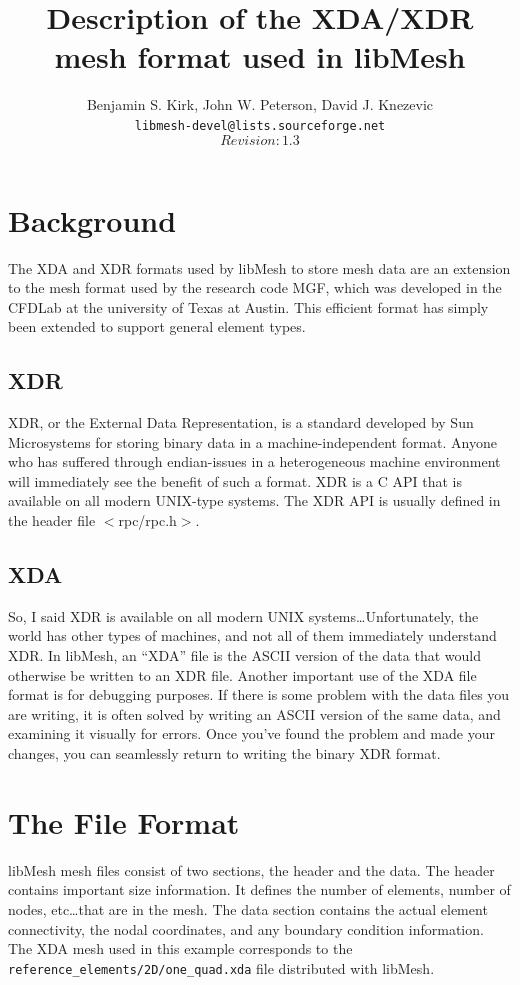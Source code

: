 \documentclass[12pt]{article}
\begin{document}
  
\title{Description of the XDA/XDR mesh format used in libMesh}
\author{Benjamin S. Kirk, John W. Peterson, David J. Knezevic \\
        \texttt{libmesh-devel@lists.sourceforge.net} \\
	$$Revision: 1.3 $$} 
\maketitle

\section{Background}
The XDA and XDR formats used by libMesh to store mesh data are an extension to the mesh format used by the research code MGF, which was developed in the CFDLab at the university of Texas at Austin.  This efficient format has simply been extended to support general element types.

\subsection{XDR}
XDR, or the External Data Representation, is a standard developed by Sun Microsystems for storing binary data in a machine-independent format.  Anyone who has suffered through endian-issues in a heterogeneous machine environment will immediately see the benefit of such a format.  XDR is a C API that is available on all modern UNIX-type systems.  The XDR API is usually defined in the header file $<$rpc/rpc.h$>$.

\subsection{XDA}
So, I said XDR is available on all modern UNIX systems\ldots Unfortunately, the world has other types of machines, and not all of them immediately understand XDR.  In libMesh, an ``XDA'' file is the ASCII version of the data that would otherwise be written to an XDR file.  Another important use of the XDA file format is for debugging purposes.  If there is some problem with the data files you are writing, it is often solved by writing an ASCII version of the same data, and examining it visually for errors.  Once you've found the problem and made your changes, you can seamlessly return to writing the binary XDR format.

\section{The File Format}
libMesh mesh files consist of two sections, the header and the data.  The header contains important size information.  It defines the number of elements, number of nodes, etc\ldots that are in the mesh.  The data section contains the actual element connectivity, the nodal coordinates, and any boundary condition information.  The XDA mesh used in this example corresponds to the \texttt{reference\_elements/2D/one\_quad.xda} file distributed with libMesh.
\end{document}

